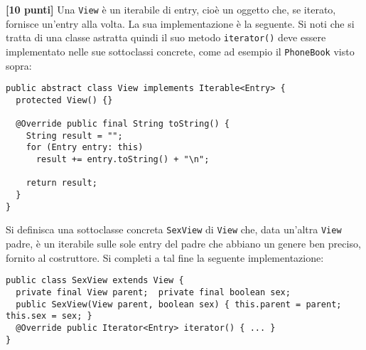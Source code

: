 \documentclass{article}[10pt]
\newcounter{esnu}
\newenvironment{esercizio}{\medskip \noindent {\bf Esercizio\addtocounter{esnu}{1} \arabic{esnu}}}{}
\begin{document}
\begin{esercizio}
\textbf{[10 punti]}
Una \texttt{View} \`e un iterabile di entry, cio\`e un oggetto che, se iterato, fornisce
un'entry alla volta. La sua implementazione \`e la seguente. Si noti che si tratta
di una classe astratta quindi il suo metodo \texttt{iterator()} deve essere
implementato nelle sue sottoclassi concrete, come ad esempio il \texttt{PhoneBook}
visto sopra:

{\scriptsize\begin{verbatim}
public abstract class View implements Iterable<Entry> {
  protected View() {}

  @Override public final String toString() {
    String result = "";
    for (Entry entry: this)
      result += entry.toString() + "\n";

    return result;
  }
}
\end{verbatim}}

\noindent
Si definisca una sottoclasse concreta \texttt{SexView} di \texttt{View} che, data
un'altra \texttt{View} padre, \`e un iterabile sulle sole entry del padre che abbiano
un genere ben preciso, fornito al costruttore. Si completi a tal fine la seguente
implementazione:

{\scriptsize\begin{verbatim}
public class SexView extends View {
  private final View parent;  private final boolean sex;
  public SexView(View parent, boolean sex) { this.parent = parent;  this.sex = sex; }
  @Override public Iterator<Entry> iterator() { ... }
}
\end{verbatim}}

\end{esercizio}
\end{document}
